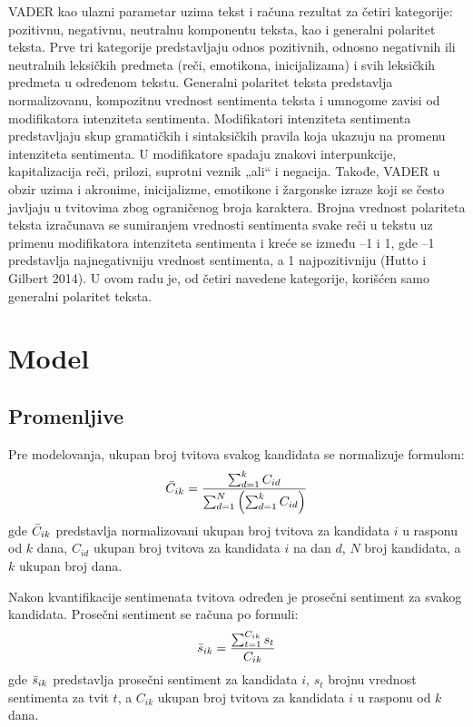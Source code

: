 VADER kao ulazni parametar uzima tekst i računa rezultat za četiri kategorije: pozitivnu, negativnu,
neutralnu komponentu teksta, kao i generalni polaritet teksta. Prve tri kategorije predstavljaju odnos
pozitivnih, odnosno negativnih ili neutralnih leksičkih predmeta (reči, emotikona, inicijalizama) i svih
leksičkih predmeta u određenom tekstu. Generalni polaritet teksta predstavlja normalizovanu,
kompozitnu vrednost sentimenta teksta i umnogome zavisi od modifikatora intenziteta sentimenta.
Modifikatori intenziteta sentimenta predstavljaju skup gramatičkih i sintaksičkih pravila koja ukazuju
na promenu intenziteta sentimenta. U modifikatore spadaju znakovi interpunkcije, kapitalizacija reči,
prilozi, suprotni veznik „ali“ i negacija. Takođe, VADER u obzir uzima i akronime, inicijalizme,
emotikone i žargonske izraze koji se često javljaju u tvitovima zbog ograničenog broja karaktera.
Brojna vrednost polariteta teksta izračunava se sumiranjem vrednosti sentimenta svake reči u tekstu
uz primenu modifikatora intenziteta sentimenta i kreće se između –1 i 1, gde –1 predstavlja
najnegativniju vrednost sentimenta, a 1 najpozitivniju (Hutto i Gilbert 2014). U ovom radu je, od četiri
navedene kategorije, korišćen samo generalni polaritet teksta.

\section{Model}

\subsection{Promenljive}

Pre modelovanja, ukupan broj tvitova svakog kandidata se normalizuje formulom:
\begin{equation*}
    \Bar{C}_{ik}=\frac{\sum^{k}_{d=1} C_{id}}{\sum^N_{d=1}\left(\sum^k_{d=1}C_{id}\right)}
\end{equation*}
gde $\Bar{C}_{ik}$ predstavlja normalizovani ukupan broj tvitova za kandidata $i$ u rasponu od $k$ dana, $C_{id}$ ukupan broj tvitova za kandidata $i$ na dan $d$, $N$ broj kandidata, a $k$ ukupan broj dana.

Nakon kvantifikacije sentimenata tvitova određen je prosečni sentiment za svakog kandidata. Prosečni
sentiment se računa po formuli:
\begin{equation*}
    \Bar{s}_{ik}=\frac{\sum^{C_{ik}}_{t=1} s_t}{C_{ik}}
\end{equation*}
gde $\Bar{s}_{ik}$ predstavlja prosečni sentiment za kandidata $i$, $s_t$ brojnu vrednost sentimenta za tvit $t$, a $C_{ik}$ ukupan broj tvitova za kandidata $i$ u rasponu od $k$ dana.

